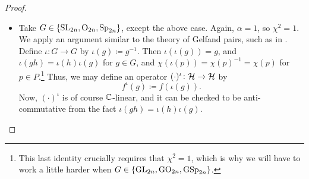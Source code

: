 \begin{proof}
\begin{itemize}
        \item Take $G\in\{\mathrm{SL}_{2n},\mathrm{O}_{2n},\mathrm{Sp}_{2n}\}$, except the above case. Again, $\alpha=1$, so $\chi^2=1$. We apply an argument similar to the theory of Gelfand pairs, such as in \cite[Theorem~45.2]{bump-lie-group}. Define $\iota\colon G\to G$ by $\iota(g)\coloneqq g^{-1}$. Then $\iota(\iota(g))=g$, and $\iota(gh)=\iota(h)\iota(g)$ for $g\in G$, and $\chi(\iota(p))=\chi(p)^{-1}=\chi(p)$ for $p\in P$.\footnote{This last identity crucially requires that $\chi^2=1$, which is why we will have to work a little harder when $G\in\{{\operatorname{GL}_{2n}},{\operatorname{GO}_{2n}},{\operatorname{GSp}_{2n}}\}$.}
        Thus, we may define an operator $(\cdot)^\iota\colon\mathcal{H}\to\mathcal{H}$ by
        \[f^\iota(g)\coloneqq f(\iota(g)).\]
        Now, $(\cdot)^\iota$ is of course $\mathbb C$-linear, and it can be checked to be anti-commutative from the fact $\iota(gh)=\iota(h)\iota(g)$.
        

\end{itemize}
\end{proof}
